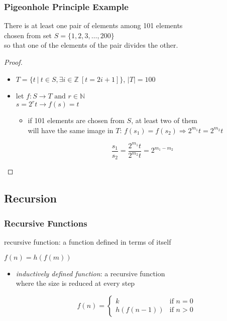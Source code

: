 \documentclass[dvipsnames]{beamer}
\begin{document}
\begin{frame}
  \frametitle{Pigeonhole Principle Example}

  \begin{theorem}
    There is at least one pair of elements among 101 elements\\
    chosen from set $S = \{1,2,3,\dots,200\}$\\
    so that one of the elements of the pair divides the other.
  \end{theorem}

  \pause
  \begin{proof}
    \begin{itemize}
      \item $T=\{t~|~t \in S, \exists i \in \mathbb{Z}~[t=2i+1]\}$, $|T|=100$

      \pause
      \item let $f: S \rightarrow T \mbox{ and }r \in \mathbb{N}$\\
        $s = 2^r t \rightarrow f(s) = t$
      \begin{itemize}
        \item if 101 elements are chosen from $S$, at least two of them\\
          will have the same image in $T$:
          $f(s_1)=f(s_2) \Rightarrow 2^{m_1} t = 2^{m_2} t$

        \pause
        \[
          \frac {s_1} {s_2} = \frac {2^{m_1} t} {2^{m_2} t} = 2^{m_1 - m_2}
        \]
      \end{itemize}
    \end{itemize}
  \end{proof}
\end{frame}

\subsection{Recursion}

\begin{frame}
  \frametitle{Recursive Functions}

  \begin{definition}
    \alert{recursive function}: a function defined in terms of itself

    \medskip
    $f(n) = h(f(m))$
  \end{definition}

  \begin{itemize}
    \item \emph{inductively defined function}: a recursive function\\
      where the size is reduced at every step

    \medskip
    \[
      f(n) =
        \begin{cases}
          k         & \mbox{if } n = 0\\
          h(f(n-1)) & \mbox{if } n > 0
        \end{cases}
    \]
  \end{itemize}
\end{frame}
\end{document}
